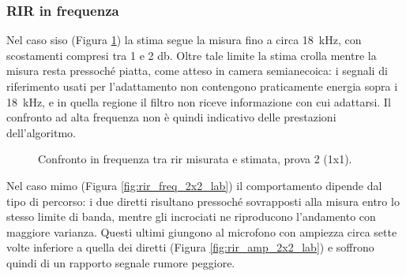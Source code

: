 \documentclass[11pt,a4paper]{article}
\begin{document}
	\subsubsection{RIR in frequenza}
	Nel caso \ac{siso} (Figura \ref{fig:rir_freq_1x1_lab}) la stima segue la misura fino a circa \SI{18}{\kilo\hertz}, con scostamenti compresi tra 1 e 2 \si{\decibel}. 
	Oltre tale limite la stima crolla mentre la misura resta pressoché piatta, come atteso in camera semianecoica: i segnali di riferimento usati per l'adattamento non contengono praticamente energia sopra i \SI{18}{\kilo\hertz}, e in quella regione il filtro non riceve informazione con cui adattarsi. Il confronto ad alta frequenza non è quindi indicativo delle prestazioni dell'algoritmo.

	\begin{figure}[H]
		\centering
		\caption{Confronto in frequenza tra \ac{rir} misurata e stimata, prova 2 (1x1).}
		\label{fig:rir_freq_1x1_lab}
	\end{figure}

	Nel caso \ac{mimo} (Figura \ref{fig:rir_freq_2x2_lab}) il comportamento dipende dal tipo di percorso: i due diretti risultano pressoché sovrapposti alla misura entro lo stesso limite di banda, mentre gli incrociati ne riproducono l'andamento con maggiore varianza.
	Questi ultimi giungono al microfono con ampiezza circa sette volte inferiore a quella dei diretti (Figura \ref{fig:rir_amp_2x2_lab}) e soffrono quindi di un rapporto segnale rumore peggiore.
\end{document}
